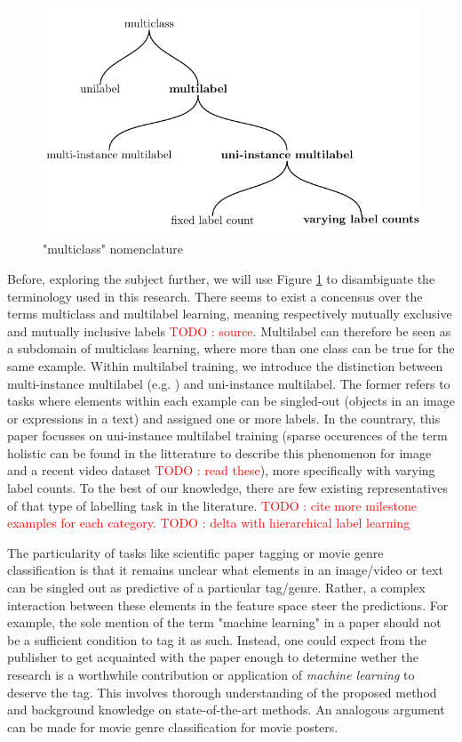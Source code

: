 \documentclass[sigconf,natbib,screen=true,review=true,anonymous]{acmart}
\newcommand\todo[1]{\textcolor{red}{TODO : #1}}
\begin{document}
\begin{figure}[htbp]
\centering
\includegraphics[width=.9\linewidth]{./tree/Tree.pdf}
\caption{\label{fig:tree}
"multiclass" nomenclature}
\end{figure}

Before, exploring the subject further, we will use Figure \ref{fig:tree} to disambiguate the terminology used in this research. There seems to exist a concensus over the terms multiclass and multilabel learning, meaning respectively mutually exclusive and mutually inclusive labels \todo{source}. Multilabel can therefore be seen as a subdomain of multiclass learning, where more than one class can be true for the same example. Within multilabel training, we introduce the distinction between multi-instance multilabel (e.g. \cite{multiInstance}) and uni-instance multilabel. The former refers to tasks where elements within each example can be singled-out (objects in an image or expressions in a text) and assigned one or more labels. In the countrary, this paper focusses on uni-instance multilabel training (sparse occurences of the term holistic can be found in the litterature to describe this phenomenon for image \cite{holisticImageDescriptors,holisticLungs} and a recent video dataset \cite{holisticVideoData} \todo{read these}), more specifically with varying label counts. To the best of our knowledge, there are few existing representatives of that type of labelling task in the literature. \todo{cite more milestone examples for each category.} \todo{delta with hierarchical label learning}

The particularity of tasks like scientific paper tagging or movie genre classification is that it remains unclear what elements in an image/video or text can be singled out as predictive of a particular tag/genre. Rather, a complex interaction between these elements in the feature space steer the predictions. For example, the sole mention of the term "machine learning" in a paper should not be a sufficient condition to tag it as such. Instead, one could expect from the publisher to get acquainted with the paper enough to determine wether the research is a worthwhile contribution or application of \emph{machine learning} to deserve the tag. This involves thorough understanding of the proposed method and background knowledge on state-of-the-art methods. An analogous argument can be made for movie genre classification for movie posters.
\end{document}
